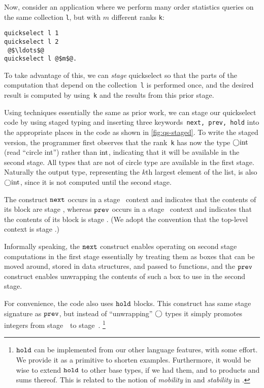 Now, consider an application where we perform many order statistics queries
on the same collection \texttt{l}, but with $m$ different ranks \texttt{k}:
%
\begin{lstlisting}
quickselect l 1
quickselect l 2
 @$\ldots$@ 
quickselect l @$m$@.
\end{lstlisting}
%
To take advantage of this, we can \emph{stage} quickselect so that the parts of
the computation that depend on the collection~\texttt{l} is performed once, and
the desired result is computed by using~\texttt{k} and the results from this
prior stage.



Using techniques essentially the same as
prior work, we can stage our quickselect code by using staged typing
and inserting three keywords~\texttt{next, prev, hold} into the
appropriate places in the code as shown in \ref{fig:qs-staged}. To
write the staged version, the programmer first observes that the
rank~\texttt{k} has now the type $\bigcirc{\rm int}$ (read ``circle int'')
rather than ${\rm int}$, indicating that it will be available in the
second stage.  All types that are not of circle type are available in
the first stage.  Naturally the output type, representing the $k$th
largest element of the list, is also $\bigcirc{\rm int}$, since it is not
computed until the second stage. 


The construct ${\tt next}$ occurs in a stage \bbone\ context and indicates that the
contents of its block are stage \bbtwo, whereas ${\tt prev}$ occurs in a stage
\bbtwo\ context and indicates that the contents of its block is stage \bbone.
(We adopt the convention that the top-level context is stage \bbone.) 

Informally speaking, the ${\tt next}$ construct enables operating on second stage
computations in the first stage essentially by treating them as boxes that can
be moved around, stored in data structures, and passed to functions, and the
${\tt prev}$ construct enables unwrapping the contents of such a box to use in the
second stage. 

For convenience, the code also uses ${\tt hold}$ blocks.  This construct
has same stage signature as ${\tt prev}$, but instead of ``unwrapping''
$\bigcirc$ types it simply promotes integers from stage~\bbone\ to
stage~\bbtwo.%
\footnote{${\tt hold}$ can be implemented from our other language features, with
some effort. We provide it as a primitive to shorten examples. Furthermore, it
would be wise to extend ${\tt hold}$ to other base types, if we had them, and to
products and sums thereof.  This is related to the notion of {\em mobility} in
\cite{murphy05} and {\em stability} in \cite{krishnaswami13}.}

